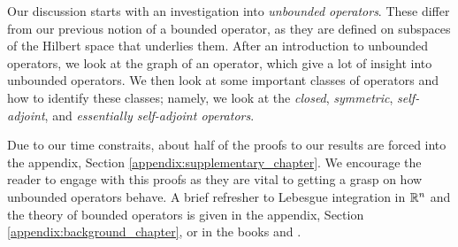 Our discussion starts with an investigation into {\emph{unbounded operators}}. These differ from our previous notion of a bounded operator, as they are defined on subspaces of the Hilbert space that underlies them. After an introduction to unbounded operators, we look at the graph of an operator, which give a lot of insight into unbounded operators. We then look at some important classes of operators and how to identify these classes; namely, we look at the {\emph{closed}}, {\emph{symmetric}}, {\emph{self-adjoint}}, and {\emph{essentially self-adjoint operators}}.

\medskip

Due to our time constraits, about half of the proofs to our results are forced into the appendix, Section \eqref{appendix:supplementary_chapter}. We encourage the reader to engage with this proofs as they are vital to getting a grasp on how unbounded operators behave. A brief refresher to Lebesgue integration in $\mathbb{R}^n$ and the theory of bounded operators is given in the appendix, Section \eqref{appendix:background_chapter}, or in the books {\cite{stein}} and {\cite{muscat}}.

%
%
%
%
%


